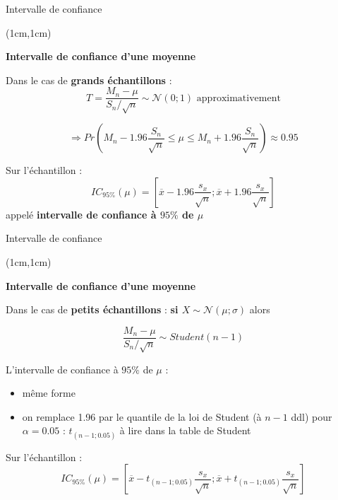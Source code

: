 \documentclass{beamer}
\begin{document}

\begin{frame}{Intervalle de confiance}
\begin{textblock*}{\textwidth}(1cm,1cm)

\begin{center}{\bf \Large Intervalle de confiance d'une moyenne} \end{center}

\vspace{0.2cm}
Dans le cas de {\bf grands échantillons} : \\
$$
T = \frac{M_n-\mu}{S_n/\sqrt{n}} \sim \mathcal{N}(0 ; 1) \text{ approximativement}
$$


$$
\Rightarrow Pr\left(M_n -1.96 \frac{S_n}{\sqrt{n}} \leq \mu \leq M_n + 1.96 \frac{S_n}{\sqrt{n}}\right) \approx 0.95
$$

Sur l'échantillon : 
$$\displaystyle IC_{95\%}(\mu) = \left[\overline{x} - 1.96 \frac{s_x}{\sqrt{n}} ; \overline{x} + 1.96 \frac{s_x}{\sqrt{n}}\right]$$
appelé { \bf intervalle de confiance à $95 \%$ de $\mu$} \\

\end{textblock*}

\end{frame}
 

\begin{frame}{Intervalle de confiance}
\begin{textblock*}{\textwidth}(1cm,1cm)

\begin{center}{\bf \Large Intervalle de confiance d'une moyenne} \end{center}

Dans le cas de {\bf petits échantillons} : {\bf si  $X\sim \mathcal{N}(\mu ; \sigma)$} alors  

$$\frac{M_n-\mu}{S_n/\sqrt{n}} \sim Student(n-1)$$

L'intervalle de confiance à $95 \%$ de $\mu$  :

\begin{itemize}
\item même forme
\item  on remplace 1.96 par le quantile de la loi de Student (à $n-1$ ddl) pour $\alpha=0.05$ : $t_{(n-1;0.05)}$ à lire dans la table de Student
\end{itemize} 
\vspace{0.2cm}
Sur l'échantillon : 
$$\displaystyle IC_{95\%}(\mu) = \left[\overline{x} - t_{(n-1;0.05)} \frac{s_x}{\sqrt{n}} ; \overline{x} + t_{(n-1;0.05)} \frac{s_x}{\sqrt{n}}\right]$$

\end{textblock*}

\end{frame}
  
\end{document}
